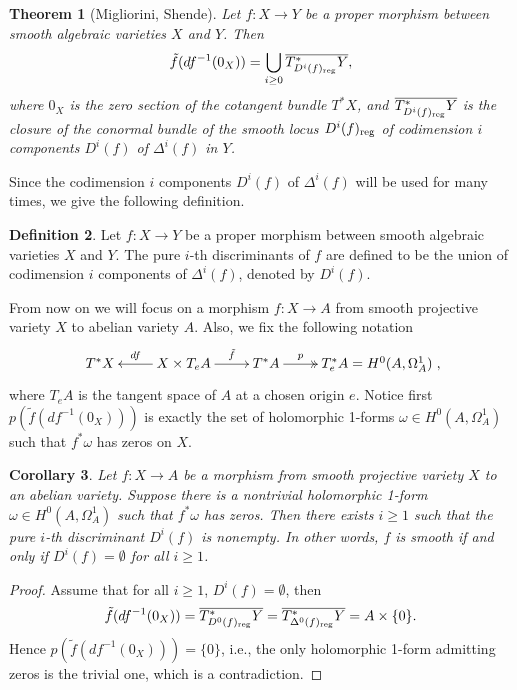 \documentclass[a4paper,12pt,reqno]{amsart}
\newtheorem{theorem}{Theorem}[section]
\theoremstyle{plain}
\newtheorem{corollary}[theorem]{Corollary}
\theoremstyle{definition}
\newtheorem{definition}[theorem]{Definition}
\theoremstyle{remark}
\begin{document}
\begin{theorem}[Migliorini, Shende]\label{MiSh}
Let $f: X\to Y$ be a proper morphism between smooth algebraic varieties $X$ and $Y$. Then $$\tilde{f}(df^{-1}(0_X))=\bigcup_{i\geq0}\overline{T^*_{D^i(f)_{\textnormal{reg}}}Y},$$ where $0_X$ is the zero section of the cotangent bundle $T^*X$, and $\overline{T^*_{D^i(f)_{\textnormal{reg}}}Y}$ is the closure of the conormal bundle of the smooth locus $D^i(f)_{\textnormal{reg}}$ of codimension $i$ components  $D^i(f)$ of $\Delta^i(f)$ in $Y$.
\end{theorem}

Since the codimension $i$ components $D^i(f)$ of $\Delta^i(f)$ will be used for many times, we give the following definition.

\begin{definition}
Let $f: X\to Y$ be a proper morphism between smooth algebraic varieties $X$ and $Y$. The pure $i$-th discriminants of $f $ are defined to be
the union of codimension $i$ components of $\Delta^i(f)$, denoted by $D^i(f)$.
\end{definition}

From now on we will focus on a morphism $f: X\to A$ from smooth projective variety $X$ to abelian variety $A$. Also, we fix the following notation
$$\xymatrix{
T^*X
& X\times T_eA \ar[l]_-{df} \ar[r]^-{\tilde{f}} &T^*A\ar@{->>}[r]^-p& T^*_e A=H^0(A, \Omega_A^1)
},$$ where $T_eA$ is the tangent space of $A$ at a chosen origin $e$. Notice first $p(\tilde{f}(df^{-1}(0_X)))$ is exactly the set of holomorphic 1-forms $\omega\in H^0(A, \Omega_A^1)$ such that $f^*\omega$ has zeros on $X$.

\begin{corollary}\label{Cor:MiShCor}
Let $f: X\to A$ be a morphism from smooth projective variety $X$ to an abelian variety. Suppose there is a nontrivial holomorphic 1-form $\omega\in H^0(A, \Omega_A^1)$ such that $f^*\omega$ has zeros. Then there exists $i\geq1$ such that the pure $i$-th discriminant $D^i(f)$ is nonempty. In other words, $f$ is smooth if and only if $D^i(f)=\emptyset$ for all $i\geq 1$.
\end{corollary}

\begin{proof}
Assume that for all $i\geq 1$, $D^i(f)=\emptyset$, then $$\tilde{f}(df^{-1}(0_X))=\overline{T^*_{D^0(f)_{\textnormal{reg}}}Y}=\overline{T^*_{\Delta^0(f)_{\textnormal{reg}}}Y}=A\times \{0\}.$$ Hence $p(\tilde{f}(df^{-1}(0_X)))=\{0\}$, i.e., the only holomorphic 1-form admitting zeros is the trivial one, which is a contradiction.
\end{proof}
\end{document}
